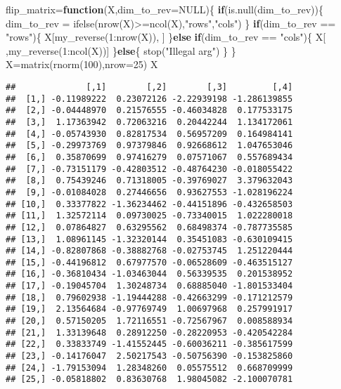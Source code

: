 \documentclass[
]{article}
\newenvironment{Shaded}{\begin{snugshade}}{\end{snugshade}}
\newcommand{\AttributeTok}[1]{\textcolor[rgb]{0.77,0.63,0.00}{#1}}
\newcommand{\ConstantTok}[1]{\textcolor[rgb]{0.00,0.00,0.00}{#1}}
\newcommand{\ControlFlowTok}[1]{\textcolor[rgb]{0.13,0.29,0.53}{\textbf{#1}}}
\newcommand{\DecValTok}[1]{\textcolor[rgb]{0.00,0.00,0.81}{#1}}
\newcommand{\FunctionTok}[1]{\textcolor[rgb]{0.00,0.00,0.00}{#1}}
\newcommand{\NormalTok}[1]{#1}
\newcommand{\OtherTok}[1]{\textcolor[rgb]{0.56,0.35,0.01}{#1}}
\newcommand{\SpecialCharTok}[1]{\textcolor[rgb]{0.00,0.00,0.00}{#1}}
\newcommand{\StringTok}[1]{\textcolor[rgb]{0.31,0.60,0.02}{#1}}
\begin{document}
\begin{Shaded}
\begin{Highlighting}[]
\NormalTok{flip\_matrix}\OtherTok{=}\ControlFlowTok{function}\NormalTok{(X,}\AttributeTok{dim\_to\_rev=}\ConstantTok{NULL}\NormalTok{)\{}
  \ControlFlowTok{if}\NormalTok{(}\FunctionTok{is.null}\NormalTok{(dim\_to\_rev))\{}
\NormalTok{    dim\_to\_rev }\OtherTok{=} \FunctionTok{ifelse}\NormalTok{(}\FunctionTok{nrow}\NormalTok{(X)}\SpecialCharTok{\textgreater{}=}\FunctionTok{ncol}\NormalTok{(X),}\StringTok{"rows"}\NormalTok{,}\StringTok{"cols"}\NormalTok{)}
\NormalTok{  \}}
  \ControlFlowTok{if}\NormalTok{(dim\_to\_rev }\SpecialCharTok{==} \StringTok{"rows"}\NormalTok{)\{}
\NormalTok{    X[}\FunctionTok{my\_reverse}\NormalTok{(}\DecValTok{1}\SpecialCharTok{:}\FunctionTok{nrow}\NormalTok{(X)), ]}
\NormalTok{  \}}\ControlFlowTok{else} \ControlFlowTok{if}\NormalTok{(dim\_to\_rev }\SpecialCharTok{==} \StringTok{"cols"}\NormalTok{)\{}
\NormalTok{    X[ ,}\FunctionTok{my\_reverse}\NormalTok{(}\DecValTok{1}\SpecialCharTok{:}\FunctionTok{ncol}\NormalTok{(X))]}
\NormalTok{  \}}\ControlFlowTok{else}\NormalTok{\{}
    \FunctionTok{stop}\NormalTok{(}\StringTok{"Illegal arg"}\NormalTok{)}
\NormalTok{  \}}
\NormalTok{\}}
\NormalTok{X}\OtherTok{=}\FunctionTok{matrix}\NormalTok{(}\FunctionTok{rnorm}\NormalTok{(}\DecValTok{100}\NormalTok{),}\AttributeTok{nrow=}\DecValTok{25}\NormalTok{)}
\NormalTok{X}
\end{Highlighting}
\end{Shaded}

\begin{verbatim}
##              [,1]        [,2]        [,3]         [,4]
##  [1,] -0.11989222  0.23072126 -2.22939198 -1.286139855
##  [2,] -0.04448970  0.21576555 -0.46034828  0.177533175
##  [3,]  1.17363942  0.72063216  0.20442244  1.134172061
##  [4,] -0.05743930  0.82817534  0.56957209  0.164984141
##  [5,] -0.29973769  0.97379846  0.92668612  1.047653046
##  [6,]  0.35870699  0.97416279  0.07571067  0.557689434
##  [7,] -0.73151179 -0.42803512 -0.48764230 -0.018055422
##  [8,]  0.75439246  0.71318005 -0.39769027  3.379632043
##  [9,] -0.01084028  0.27446656  0.93627553 -1.028196224
## [10,]  0.33377822 -1.36234462 -0.44151896 -0.432658503
## [11,]  1.32572114  0.09730025 -0.73340015  1.022280018
## [12,]  0.07864827  0.63295562  0.68498374 -0.787735585
## [13,]  1.08961145 -1.32320144  0.35451083 -0.630109415
## [14,] -0.82807868 -0.38882768 -0.02753745  1.251220444
## [15,] -0.44196812  0.67977570 -0.06528609 -0.463515127
## [16,] -0.36810434 -1.03463044  0.56339535  0.201538952
## [17,] -0.19045704  1.30248734  0.68885040 -1.801533404
## [18,]  0.79602938 -1.19444288 -0.42663299 -0.171212579
## [19,]  2.13564684 -0.97769749  1.00697968  0.257991917
## [20,]  0.57150205  1.72116551 -0.72567967  0.008588934
## [21,]  1.33139648  0.28912250 -0.28220953 -0.420542284
## [22,]  0.33833749 -1.41552445 -0.60036211 -0.385617599
## [23,] -0.14176047  2.50217543 -0.50756390 -0.153825860
## [24,] -1.79153094  1.28348260  0.05575512  0.668709999
## [25,] -0.05818802  0.83630768  1.98045082 -2.100070781
\end{verbatim}
\end{document}
